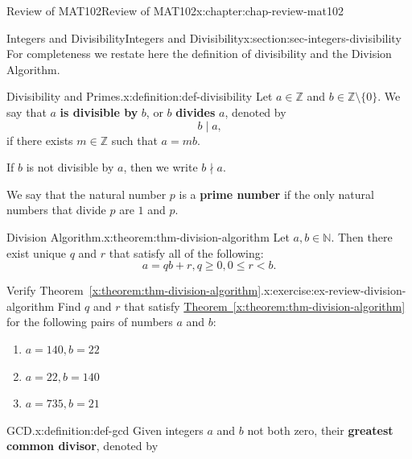 \documentclass[oneside,10pt,]{book}
\newcommand{\xreffont}{\relax}
\newcommand{\terminology}[1]{\textbf{#1}}
\numberwithin{equation}{section}
\newcommand{\lt}{<}
\begin{document}
\begin{chapterptx}{Review of MAT102}{}{Review of MAT102}{}{}{x:chapter:chap-review-mat102}
\typeout{************************************************}
%
\begin{sectionptx}{Integers and Divisibility}{}{Integers and Divisibility}{}{}{x:section:sec-integers-divisibility}
For completeness we restate here the definition of divisibility and the Division Algorithm.%
\begin{definition}{Divisibility and Primes.}{x:definition:def-divisibility}%
\label{g:notation:id524474} Let \(a \in \mathbb{Z}\) and \(b \in \mathbb{Z} \setminus \{0\}\). We say that \(a\) \terminology{is divisible by} \(b\), or \(b\) \terminology{divides} \(a\), denoted by%
\begin{equation*}
b \mid a\text{,}
\end{equation*}
if there exists \(m \in \mathbb{Z}\) such that \(a = mb\).%
\par
If \(b\) is not divisible by \(a\), then we write \(b \nmid a\).%
\par
We say that the natural number \(p\) is a \terminology{prime number} if the only natural numbers that divide \(p\) are \(1\) and \(p\).%
\end{definition}
\begin{theorem}{Division Algorithm.}{}{x:theorem:thm-division-algorithm}%
Let \(a,b \in \mathbb{N}\). Then there exist unique \(q\) and \(r\) that satisfy all of the following:%
\begin{equation*}
a = qb + r, q \geq 0, 0 \leq r \lt b\text{.}
\end{equation*}
%
\end{theorem}
\begin{inlineexercise}{Verify Theorem~{\xreffont\ref*{x:theorem:thm-division-algorithm}}.}{x:exercise:ex-review-division-algorithm}%
Find \(q\) and \(r\) that satisfy \hyperref[x:theorem:thm-division-algorithm]{Theorem~{\xreffont\ref{x:theorem:thm-division-algorithm}}} for the following pairs of numbers \(a\) and \(b\):%
\begin{enumerate}[label=(\alph*)]
\item{}\(\displaystyle a = 140, b = 22\)%
\item{}\(\displaystyle a = 22, b = 140\)%
\item{}\(\displaystyle a = 735, b = 21\)%
\end{enumerate}
%
\end{inlineexercise}%
\begin{definition}{GCD.}{x:definition:def-gcd}%
\label{g:notation:id524611} Given integers \(a\) and \(b\) not both zero, their \terminology{greatest common divisor}, denoted by%

\end{definition}
\end{sectionptx}
\end{chapterptx}
\end{document}
